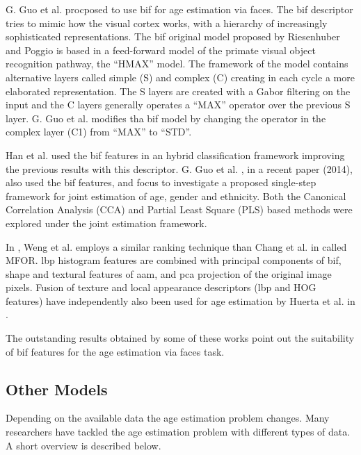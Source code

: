 G. Guo et al. \cite{conf/cvpr/GuoMFH09} procposed to use \gls{bif} \cite{Riesenhuber99hierarchicalmodels} for age estimation via faces. The \gls{bif} descriptor tries to mimic how the visual cortex works, with a hierarchy of increasingly sophisticated representations. The \gls{bif} original model proposed by Riesenhuber and Poggio \cite{Riesenhuber99hierarchicalmodels} is based in a feed-forward model of the primate visual object recognition pathway, the ``HMAX'' model. The framework of the model contains alternative layers called simple (S) and complex (C) creating in each cycle a more elaborated representation. The S layers are created with a Gabor filtering on the input and the C layers generally operates a ``MAX'' operator over the previous S layer. G. Guo et al. \cite{conf/cvpr/GuoMFH09} modifies tha \gls{bif} model by changing the operator in the complex layer (C1) from ``MAX'' to ``STD''.

Han et al. \cite{han:age} used the \gls{bif} features in an hybrid classification framework improving the previous results with this descriptor. G. Guo et al. \cite{Guo2014761}, in a recent paper (2014), also used the \gls{bif} features, and focus to investigate a proposed single-step framework for joint estimation of age, gender and ethnicity. Both the Canonical Correlation Analysis (CCA) \cite{hotelling1936relations} and Partial Least Square (PLS) based methods were explored under the joint estimation framework.

In \cite{6553772}, Weng et al. employs a similar ranking technique than Chang et al. in \cite{5995437} called MFOR. \gls{lbp} histogram features are combined with principal components of \gls{bif}, shape and textural features of \gls{aam}, and \gls{pca} projection of the original image pixels. Fusion of texture and local appearance descriptors (\gls{lbp} and HOG features) have independently also been used for age estimation by Huerta et al. in \cite{HuFerPra14}.

The outstanding results obtained by some of these works point out the suitability of \gls{bif} features for the age estimation via faces task.

\subsection{Other Models}\label{subsec:oth}

Depending on the available data the age estimation problem changes. Many researchers have tackled the age estimation problem with different types of data. A short overview is described below.


